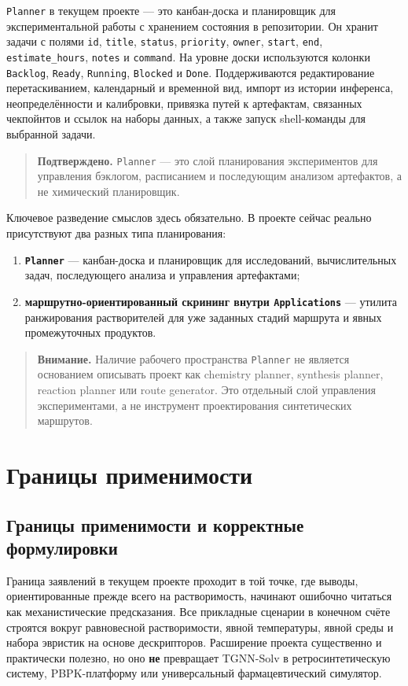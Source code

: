\documentclass[11pt]{article}
\newcommand{\warnnote}[1]{\begin{quote}\textbf{Внимание.} #1\end{quote}}
\newcommand{\validated}[1]{\begin{quote}\textbf{Подтверждено.} #1\end{quote}}
\begin{document}
\texttt{Planner} в текущем проекте --- это канбан-доска и планировщик для экспериментальной работы с хранением состояния в репозитории. Он хранит задачи с полями \texttt{id}, \texttt{title}, \texttt{status}, \texttt{priority}, \texttt{owner}, \texttt{start}, \texttt{end}, \texttt{estimate\_hours}, \texttt{notes} и \texttt{command}. На уровне доски используются колонки \texttt{Backlog}, \texttt{Ready}, \texttt{Running}, \texttt{Blocked} и \texttt{Done}. Поддерживаются редактирование перетаскиванием, календарный и временной вид, импорт из истории инференса, неопределённости и калибровки, привязка путей к артефактам, связанных чекпойнтов и ссылок на наборы данных, а также запуск shell-команды для выбранной задачи.

\validated{\texttt{Planner} --- это слой планирования экспериментов для управления бэклогом, расписанием и последующим анализом артефактов, а не химический планировщик.}

Ключевое разведение смыслов здесь обязательно. В проекте сейчас реально присутствуют два разных типа планирования:
\begin{enumerate}
  \item \textbf{\texttt{Planner}} --- канбан-доска и планировщик для исследований, вычислительных задач, последующего анализа и управления артефактами;
  \item \textbf{маршрутно-ориентированный скрининг внутри \texttt{Applications}} --- утилита ранжирования растворителей для уже заданных стадий маршрута и явных промежуточных продуктов.
\end{enumerate}

\warnnote{Наличие рабочего пространства \texttt{Planner} не является основанием описывать проект как chemistry planner, synthesis planner, reaction planner или route generator. Это отдельный слой управления экспериментами, а не инструмент проектирования синтетических маршрутов.}

\section{Границы применимости}

\subsection{Границы применимости и корректные формулировки}

Граница заявлений в текущем проекте проходит в той точке, где выводы, ориентированные прежде всего на растворимость, начинают ошибочно читаться как механистические предсказания. Все прикладные сценарии в конечном счёте строятся вокруг равновесной растворимости, явной температуры, явной среды и набора эвристик на основе дескрипторов. Расширение проекта существенно и практически полезно, но оно \textbf{не} превращает TGNN-Solv в ретросинтетическую систему, PBPK-платформу или универсальный фармацевтический симулятор.
\end{document}
